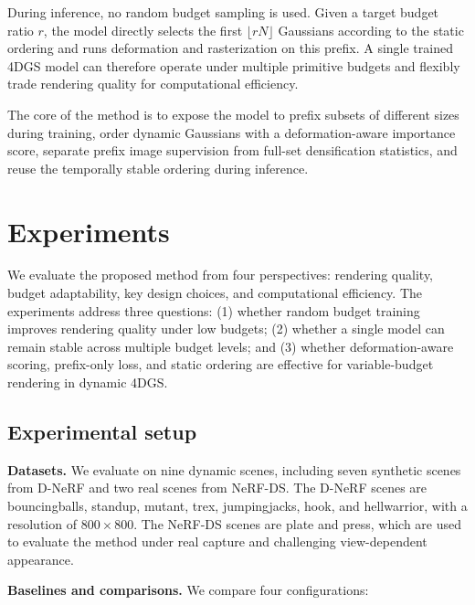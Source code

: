 \documentclass[pdflatex,sn-mathphys]{sn-jnl}
\begin{document}
During inference, no random budget sampling is used. Given a target budget ratio $r$, the model directly selects the first $\lfloor rN \rfloor$ Gaussians according to the static ordering and runs deformation and rasterization on this prefix. A single trained 4DGS model can therefore operate under multiple primitive budgets and flexibly trade rendering quality for computational efficiency.

The core of the method is to expose the model to prefix subsets of different sizes during training, order dynamic Gaussians with a deformation-aware importance score, separate prefix image supervision from full-set densification statistics, and reuse the temporally stable ordering during inference.

\section{Experiments}
\label{sec:experiments}

We evaluate the proposed method from four perspectives: rendering quality, budget adaptability, key design choices, and computational efficiency. The experiments address three questions: (1) whether random budget training improves rendering quality under low budgets; (2) whether a single model can remain stable across multiple budget levels; and (3) whether deformation-aware scoring, prefix-only loss, and static ordering are effective for variable-budget rendering in dynamic 4DGS.

\subsection{Experimental setup}
\label{sec:setup}

\textbf{Datasets.} We evaluate on nine dynamic scenes, including seven synthetic scenes from D-NeRF and two real scenes from NeRF-DS. The D-NeRF scenes are bouncingballs, standup, mutant, trex, jumpingjacks, hook, and hellwarrior, with a resolution of $800\times800$. The NeRF-DS scenes are plate and press, which are used to evaluate the method under real capture and challenging view-dependent appearance.

\textbf{Baselines and comparisons.} We compare four configurations:
\end{document}
